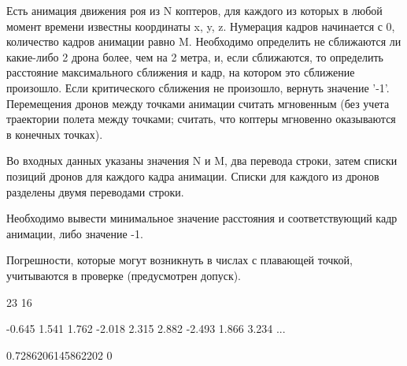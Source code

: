 
Есть анимация движения роя из N коптеров, для каждого из которых в любой момент времени известны координаты x, y, z. Нумерация кадров начинается с 0, количество кадров анимации равно M. Необходимо определить не сближаются ли какие-либо 2 дрона более, чем на 2 метра, и, если сближаются, то определить расстояние максимального сближения и кадр, на котором это сближение произошло. Если критического сближения не произошло, вернуть значение '-1'. Перемещения дронов между точками анимации считать мгновенным (без учета траектории полета между точками; считать, что коптеры мгновенно оказываются в конечных точках).


Во входных данных указаны значения N и M, два перевода строки, затем списки позиций дронов для каждого кадра анимации. Списки для каждого из дронов разделены двумя переводами строки.

\outputfmtSection

Необходимо вывести минимальное значение расстояния и соответствующий кадр анимации, либо значение -1.

Погрешности, которые могут возникнуть в числах с плавающей точкой, учитываются в проверке (предусмотрен допуск).


\begin{myverbbox}[\small]{\vinput}
    23 16

    -0.645 1.541 1.762
    -2.018 2.315 2.882
    -2.493 1.866 3.234
    ...
\end{myverbbox}
\begin{myverbbox}[\small]{\voutput}
    0.7286206145862202 0
\end{myverbbox}

